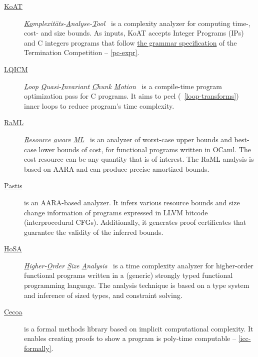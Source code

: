 \begin{description}
\item[\href{https://koat.verify.rwth-aachen.de/cfr_mprf}{KoAT}]
       \emph{\underline{Ko}mplexitäts-\underline{A}nalyse-\underline{T}ool}~\cite{brockschmidt2016}
       is a complexity analyzer for computing time-, cost- and size bounds.
       As inputs, KoAT accepts Integer Programs (IPs) and C integers programs that follow
       \href{https://termination-portal.org/wiki/C_Integer_Programs}{the grammar specification} of the Termination Competition -- \autoref{pc-expr}.

\item[\href{https://github.com/statycc/LQICM_On_C_Toy_Parser}{LQICM}]
      \emph{\underline{L}oop \underline{Q}uasi-\underline{I}nvariant \underline{C}hunk \underline{M}otion}~\cite{moyen20172}
       is a compile-time program optimization pass for C programs.
       It aims to peel (\cf~\autoref{loop-transforms}) inner loops to reduce program's time complexity.

\item[\href{https://www.raml.co/about}{RaML}]
       \emph{\underline{R}esource \underline{a}ware \underline{ML}}~\cite{hoffmann2017}
       is an analyzer of worst-case upper bounds and best-case lower bounds of cost, for functional programs written in OCaml.
       The cost resource can be any quantity that is of interest.
       The RaML analysis is based on AARA and can produce precise amortized bounds.

\item[\href{https://github.com/academic-archive/cav17-pastis}{Pastis}]\cite{carbonneaux2017,carbonneaux2018}
      is an AARA-based analyzer.
      It infers various resource bounds and size change information of programs expressed in LLVM bitcode (interprocedural CFGs).
      Additionally, it generates proof certificates that guarantee the validity of the inferred bounds.

\item[\href{http://cl-informatik.uibk.ac.at/users/zini/software/hosa/}{HoSA}]
      \emph{\underline{H}igher-\underline{O}rder \underline{S}ize \underline{A}nalysis}~\cite{avanzini2017}
      is a time complexity analyzer for higher-order functional programs written in a (generic) strongly typed functional programming language.
      The analysis technique is based on a type system and inference of sized types, and constraint solving.

\item[\href{https://github.com/davidnowak/cecoa}{Cecoa}]\cite{feree2018}
     is a formal methods library based on implicit computational complexity.
     It enables creating proofs to show a program is poly-time computable -- \autoref{icc-formally}.


\end{description}
